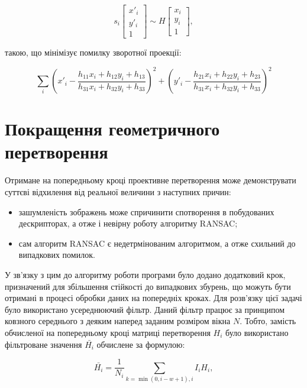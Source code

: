 \begin{equation}
  s_i \begin{bmatrix}x'_i \\ y'_i \\ 1\end{bmatrix} \sim H \begin{bmatrix} x_i \\ y_i \\ 1\end{bmatrix},
\end{equation}

такою, що мінімізує помилку зворотної проекції:

\begin{equation}
\sum _i \left ( x'_i- \frac{h_{11} x_i + h_{12} y_i + h_{13}}{h_{31} x_i + h_{32} y_i + h_{33}} \right )^2
  + 
        \left ( y'_i- \frac{h_{21} x_i + h_{22} y_i + h_{23}}{h_{31} x_i + h_{32} y_i + h_{33}} \right )^2 
\end{equation}

\section{Покращення геометричного перетворення}
Отримане на попередньому кроці проективне перетворення може демонструвати суттєві відхилення від реальної величини з наступних причин:

\begin{itemize}
  \item зашумленість зображень може спричинити спотворення в побудованих дескрипторах, а отже і невірну роботу алгоритму RANSAC;
  \item сам алгоритм RANSAC є недетрмінованим алгоритмом, а отже схильний до випадкових помилок.
\end{itemize}

У зв'язку з цим до алгоритму роботи програми було додано додатковий крок, призначений для збільшення стійкості до випадкових збурень, що можуть бути отримані в процесі обробки даних на попередніх кроках. 
Для розв'язку цієї задачі було використано усереднюючий фільтр. Даний фільтр працює за принципом ковзного середнього з деяким наперед заданим розміром вікна $N$. Тобто, замість обчисленої на попередньому кроці матриці перетворення $H_i$ було використано фільтроване значення $\bar{H_i}$ обчислене за формулою:

\begin{equation}
  \label{eq:mean-homo}
  \bar{H_i} = \frac{1}{N_i} \sum_{k=\min(0,i-w+1), i}{I_i H_i},
\end{equation}


